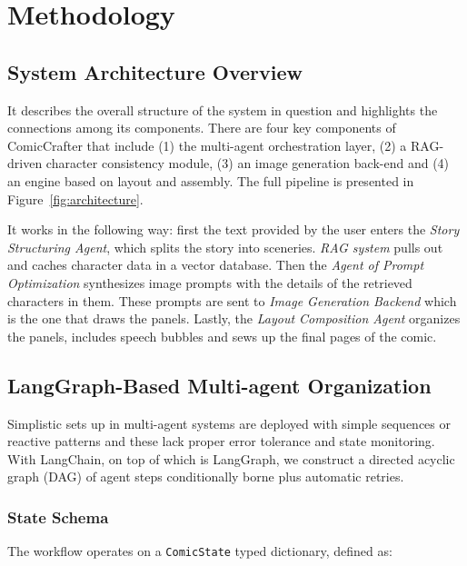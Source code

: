 \documentclass[runningheads]{llncs}
\begin{document}
\section{Methodology}
\label{sec:methodology}

\subsection{System Architecture Overview}

It describes the overall structure of the system in question and highlights the connections among its components. There are four key components of ComicCrafter that include (1) the multi-agent orchestration layer, (2) a RAG-driven character consistency module, (3) an image generation back-end and (4) an engine based on layout and assembly. The full pipeline is presented in Figure~\ref{fig:architecture}.

It works in the following way: first the text provided by the user enters the \textit{Story Structuring Agent}, which splits the story into sceneries. \textit{RAG system} pulls out and caches character data in a vector database. Then the \textit{Agent of Prompt Optimization} synthesizes image prompts with the details of the retrieved characters in them. These prompts are sent to \textit{Image Generation Backend} which is the one that draws the panels. Lastly, the \textit{Layout Composition Agent} organizes the panels, includes speech bubbles and sews up the final pages of the comic.

\subsection{LangGraph-Based Multi-agent Organization}

Simplistic sets up in multi-agent systems are deployed with simple sequences or reactive patterns and these lack proper error tolerance and state monitoring. With LangChain, on top of which is LangGraph, we construct a directed acyclic graph (DAG) of agent steps conditionally borne plus automatic retries.

\subsubsection{State Schema}

The workflow operates on a \texttt{ComicState} typed dictionary, defined as:
\end{document}
